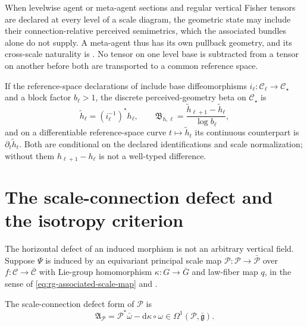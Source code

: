When levelwise agent or meta-agent sections and regular vertical Fisher tensors are declared at every
level of a scale diagram, the geometric state may include their connection-relative perceived
semimetrics, which the associated bundles alone do not supply. A meta-agent thus has its own pullback
geometry, and its cross-scale naturality is . No tensor on one
level base is subtracted from a tensor on another before both are transported to a common reference
space.

If the reference-space declarations of  include base diffeomorphisms
\(i_\ell:\mathcal C_\ell\to\mathcal C_\star\) and a block factor \(b_\ell>1\), the discrete
perceived-geometry beta on \(\mathcal C_\star\) is
\begin{equation}
\widetilde h_\ell=(i_\ell^{-1})^*h_\ell,
\qquad
\mathfrak B_{h,\ell}
=\frac{\widetilde h_{\ell+1}-\widetilde h_\ell}{\log b_\ell},
\label{eq:pb-metric-beta-reference}
\end{equation}
and on a differentiable reference-space curve \(t\mapsto\widetilde h_t\) its continuous counterpart
is \(\partial_t\widetilde h_t\). Both are conditional on the declared
identifications and scale normalization; without them \(h_{\ell+1}-h_\ell\) is not a well-typed
difference.

\section{The scale-connection defect and the isotropy criterion}
\label{sec:pb-isotropy}

The horizontal defect of an induced morphism is not an arbitrary vertical field. Suppose \(\Psi\) is
induced by an equivariant principal scale map \(\mathcal P:\mathscr P\to\bar{\mathscr P}\) over
\(f:\mathcal C\to\bar{\mathcal C}\) with Lie-group homomorphism \(\kappa:G\to\bar G\) and law-fiber map
\(q\), in the sense of \eqref{eq:rg-associated-scale-map} and
.

The scale-connection defect form of \(\mathcal P\) is
\begin{equation}
\mathfrak A_{\mathcal P}
=\mathcal P^*\bar\omega-\mathrm d\kappa\circ\omega
\in\Omega^1(\mathscr P,\bar{\mathfrak g}).
\label{eq:pb-scale-connection-defect}
\end{equation}

